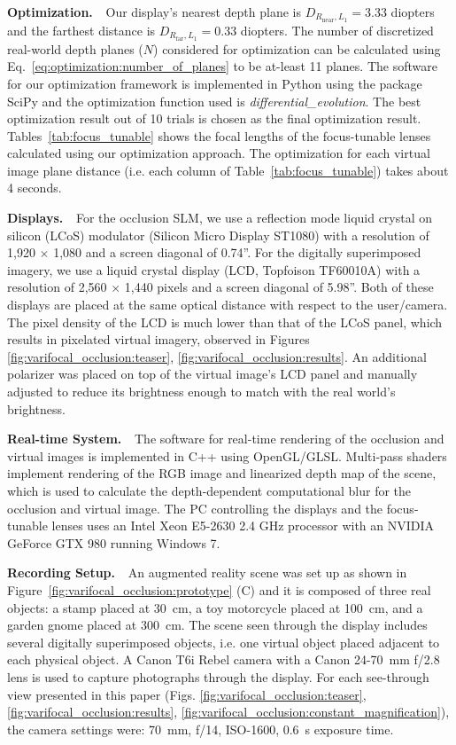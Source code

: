 {\bf Optimization. $\,\,$} 
Our display's nearest depth plane is $D_{R_{\text{near}},L_1} = 3.33$ diopters and the farthest distance is $D_{R_{\text{far}},L_1}=0.33$ diopters. The number of discretized real-world depth planes ($N$) considered for optimization can be calculated using Eq.~\eqref{eq:optimization:number_of_planes} to be at-least 11 planes. 
The software for our optimization framework is implemented in Python using the package SciPy and the optimization function used is \emph{differential\_evolution}. The best optimization result out of 10 trials is chosen as the final optimization result. Tables~\ref{tab:focus_tunable} shows the focal lengths of the focus-tunable lenses calculated using our optimization approach. The optimization for each virtual image plane distance (i.e. each column of Table~\ref{tab:focus_tunable}) takes about 4 seconds.

{\bf Displays. $\,\,$}  For the occlusion SLM, we use a reflection mode liquid crystal on silicon (LCoS) modulator (Silicon Micro Display ST1080) with a resolution of 1,920 $\times$ 1,080 and a screen diagonal of 0.74''. For the digitally superimposed imagery, we use a liquid crystal display (LCD, Topfoison TF60010A) with a resolution of 2,560 $\times$ 1,440 pixels and a screen diagonal of 5.98''. Both of these displays are placed at the same optical distance with respect to the user/camera. The pixel density of the LCD is much lower than that of the LCoS panel, which results in pixelated virtual imagery, observed in Figures \ref{fig:varifocal_occlusion:teaser}, \ref{fig:varifocal_occlusion:results}. An additional polarizer was placed on top of the virtual image's LCD panel and manually adjusted to reduce its brightness enough to match with the real world's brightness.


{\bf Real-time System. $\,\,$} The software for real-time rendering of the occlusion and virtual images is implemented in C++ using OpenGL/GLSL. Multi-pass shaders implement rendering of the RGB image and linearized depth map of the scene, which is used to calculate the depth-dependent computational blur for the occlusion and virtual image. The PC controlling the displays and the focus-tunable lenses uses an Intel Xeon E5-2630 2.4 GHz processor with an NVIDIA GeForce GTX 980 running Windows 7. 


{\bf Recording Setup. $\,\,$} An augmented reality scene was set up as shown in Figure~\ref{fig:varifocal_occlusion:prototype} (C) and it is composed of three real objects: a stamp placed at 30~cm, a toy motorcycle placed at 100~cm, and a garden gnome placed at 300~cm. The scene seen through the display includes several digitally superimposed objects, i.e. one virtual object placed adjacent to each physical object. A Canon T6i Rebel camera with a Canon 24-70~mm f/2.8 lens is used to capture photographs through the display. For each see-through view presented in this paper (Figs. \ref{fig:varifocal_occlusion:teaser}, \ref{fig:varifocal_occlusion:results}, \ref{fig:varifocal_occlusion:constant_magnification}), the camera settings were: 70~mm, f/14, ISO-1600, 0.6~s exposure time. 


